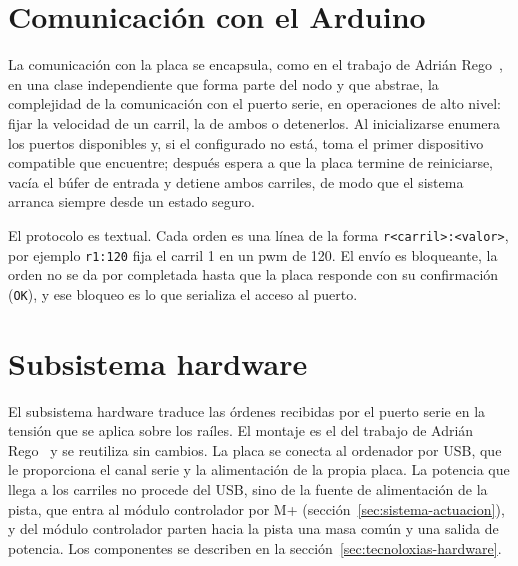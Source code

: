 \section{Comunicación con el Arduino}
\label{subsec:actuacion-interfaz}

La comunicación con la placa se encapsula, como en el trabajo de Adrián Rego~\cite{tfgadrian}, en una clase independiente que forma parte del nodo y que abstrae, la complejidad de la comunicación con el puerto serie, en operaciones de alto nivel: fijar la velocidad de un carril, la de ambos o detenerlos. Al inicializarse enumera los puertos disponibles y, si el configurado no está, toma el primer dispositivo compatible que encuentre; después espera a que la placa termine de reiniciarse, vacía el búfer de entrada y detiene ambos carriles, de modo que el sistema arranca siempre desde un estado seguro.

El protocolo es textual. Cada orden es una línea de la forma \texttt{r<carril>\allowbreak :<valor>}, por ejemplo \texttt{r1:120} fija el carril 1 en un \gls{pwm} de 120. El envío es bloqueante, la orden no se da por completada hasta que la placa responde con su confirmación (\texttt{OK}), y ese bloqueo es lo que serializa el acceso al puerto.

\section{Subsistema hardware}
\label{subsec:actuacion-hardware}

El subsistema hardware traduce las órdenes recibidas por el puerto serie en la tensión que se aplica sobre los raíles. El montaje es el del trabajo de Adrián Rego~\cite{tfgadrian} y se reutiliza sin cambios. La placa se conecta al ordenador por USB, que le proporciona el canal serie y la alimentación de la propia placa. La potencia que llega a los carriles no procede del USB, sino de la fuente de alimentación de la pista, que entra al módulo controlador por M+ (sección~\ref{sec:sistema-actuacion}), y del módulo controlador parten hacia la pista una masa común y una salida de potencia. Los componentes se describen en la sección~\ref{sec:tecnoloxias-hardware}.

